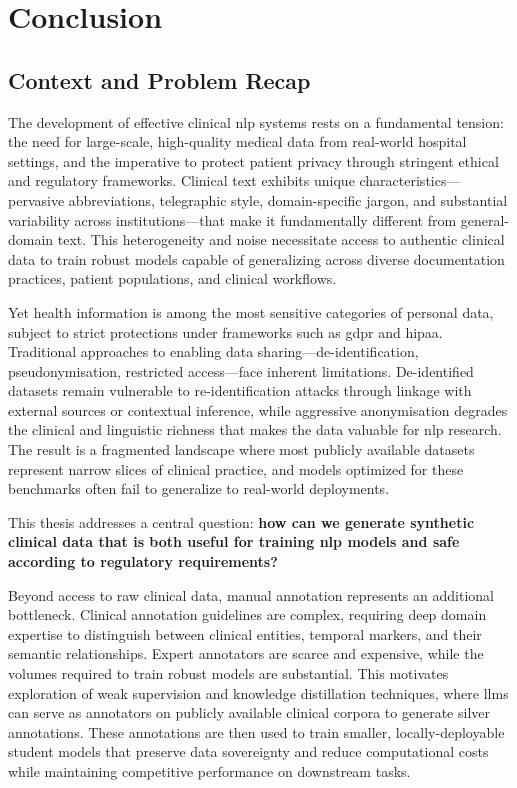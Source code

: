 \chapter{Conclusion}
\label{chap:conclusion}
\minitoc
\section{Context and Problem Recap}

The development of effective clinical \gls{nlp} systems rests on a fundamental tension: the need for large-scale, high-quality medical data from real-world hospital settings, and the imperative to protect patient privacy through stringent ethical and regulatory frameworks.
Clinical text exhibits unique characteristics—pervasive abbreviations, telegraphic style, domain-specific jargon, and substantial variability across institutions—that make it fundamentally different from general-domain text.
This heterogeneity and noise necessitate access to authentic clinical data to train robust models capable of generalizing across diverse documentation practices, patient populations, and clinical workflows.

Yet health information is among the most sensitive categories of personal data, subject to strict protections under frameworks such as \gls{gdpr} and \gls{hipaa}.
Traditional approaches to enabling data sharing—de-identification, pseudonymisation, restricted access—face inherent limitations.
De-identified datasets remain vulnerable to re-identification attacks through linkage with external sources or contextual inference, while aggressive anonymisation degrades the clinical and linguistic richness that makes the data valuable for \gls{nlp} research.
The result is a fragmented landscape where most publicly available datasets represent narrow slices of clinical practice, and models optimized for these benchmarks often fail to generalize to real-world deployments.

This thesis addresses a central question: \textbf{how can we generate synthetic clinical data that is both useful for training \gls{nlp} models and safe according to regulatory requirements?}

Beyond access to raw clinical data, manual annotation represents an additional bottleneck.
Clinical annotation guidelines are complex, requiring deep domain expertise to distinguish between clinical entities, temporal markers, and their semantic relationships.
Expert annotators are scarce and expensive, while the volumes required to train robust models are substantial.
This motivates exploration of weak supervision and knowledge distillation techniques, where \glspl{llm} can serve as annotators on publicly available clinical corpora to generate silver annotations.
These annotations are then used to train smaller, locally-deployable student models that preserve data sovereignty and reduce computational costs while maintaining competitive performance on downstream tasks.

